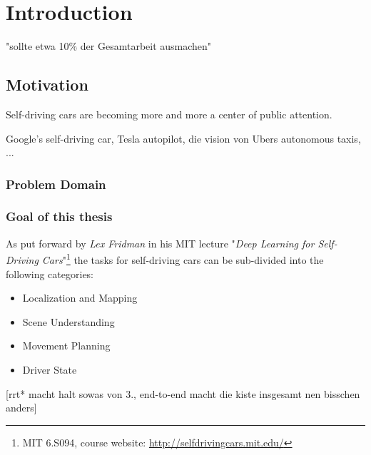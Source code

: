 
\chapter{Introduction} %

\label{ch:intro} %


\newcommand{\keyword}[1]{\textit{#1}}
\newcommand{\tabhead}[1]{\textbf{#1}}
\newcommand{\code}[1]{\texttt{#1}}
\newcommand{\file}[1]{\texttt{\bfseries#1}}
\newcommand{\option}[1]{\texttt{\itshape#1}}
\newcommand{\batchnorm}{batch normalization }
\newcommand{\Batchnorm}{Batch normalization }


"sollte etwa 10\% der Gesamtarbeit ausmachen"

\section{Motivation}
Self-driving cars are becoming more and more a center of public attention.

Google's self-driving car, Tesla autopilot, die vision von Ubers autonomous taxis, ...

\subsection{Problem Domain}



\subsection{Goal of this thesis}

As put forward by \keyword{Lex Fridman} in his MIT lecture "\keyword{Deep Learning for Self-Driving Cars}"\footnote{MIT 6.S094, course website: \url{http://selfdrivingcars.mit.edu/}} the tasks for self-driving cars can be sub-divided into the following categories: 
\begin{itemize} \bfseries
	\item Localization and Mapping
	\item Scene Understanding
	\item Movement Planning
	\item Driver State
\end{itemize}
[rrt* macht halt sowas von 3., end-to-end macht die kiste insgesamt nen bisschen anders]

